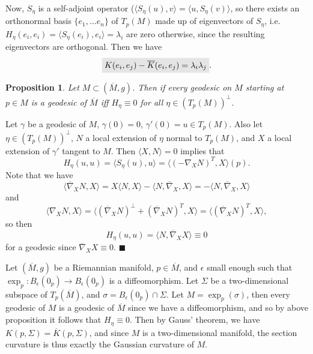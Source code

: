 \documentclass[letter-paper]{tufte-book}
\newtheorem{proposition}[theorem]{\color{pastel-blue}Proposition}
\newenvironment{proof}[1][Proof]{\begin{trivlist}
\item[\hskip \labelsep {\bfseries #1}]}{\end{trivlist}}
\newcommand{\qed}{\hfill$\blacksquare$}
\newcommand{\highlight}[1]{\mathchoice%
  {\colorbox{black!10}{$\displaystyle#1$}}%
  {\colorbox{black!10}{$\textstyle#1$}}%
  {\colorbox{black!10}{$\scriptstyle#1$}}%
  {\colorbox{black!10}{$\scriptscriptstyle#1$}}}%
\begin{document}
Now, $S_\eta$ is a self-adjoint operator ($\langle S_\eta(u), v\rangle = \langle u, S_\eta(v)\rangle$, so there exists an orthonormal basis $\{e_1,\ldots e_n\}$ of $T_p(M)$ made up of eigenvectors of $S_\eta$, i.e. $H_\eta(e_i, e_i) = \langle S_\eta(e_i), e_i\rangle = \lambda_i$ are zero otherwise, since the resulting eigenvectors are orthogonal. Then we have
\begin{equation}
  \highlight{K(e_i, e_j) - \overline{K}(e_i, e_j) = \lambda_i\lambda_j}.
\end{equation}

\begin{proposition}
  Let $M \subset (\overline{M}, g)$. Then if every geodesic on $M$ starting at $p \in M$ is a geodesic of $\overline{M}$ iff $H_\eta \equiv 0$ for all $\eta\in (T_p(M))^\perp$.
\end{proposition}

\begin{proof}
  Let $\gamma$ be a geodesic of $M$, $\gamma(0)=0$, $\gamma'(0) = u\in T_p(M)$. Also let $\eta \in (T_p(M))^\perp$, $N$ a local extension of $\eta$ normal to $T_p(M)$, and $X$ a local extension of $\gamma'$ tangent to $M$. Then $\langle X,N\rangle=0$ implies that
  \begin{equation*}
    H_\eta(u,u) = \langle S_\eta(u), u\rangle = \langle (-\nabla_X N)^T,X\rangle(p).
  \end{equation*}
  Note that we have
  \begin{equation*}
    \langle \overline{\nabla}_X N, X\rangle = X\langle N,X\rangle - \langle N, \overline{\nabla}_X, X\rangle = - \langle N, \overline{\nabla}_X, X\rangle
  \end{equation*}
  and
  \begin{equation*}
    \langle \nabla_X N, X\rangle = \langle (\overline{\nabla}_X N)^\perp + (\overline{\nabla}_X N)^T, X\rangle = \langle (\overline{\nabla}_X N)^T, X\rangle,
  \end{equation*}
  so then
  \begin{equation*}
    H_\eta(u,u) = \langle N, \overline{\nabla}_X X\rangle \equiv 0
  \end{equation*}
  for a geodesic since $\overline{\nabla}_X X \equiv 0$. \qed
\end{proof}

Let $(\overline{M},g)$ be a Riemannian manifold, $p\in\overline{M}$, and $\epsilon$ small enough such that $\exp_p: B_\epsilon(0_p) \to B_\epsilon(0_p)$ is a diffeomorphism. Let $\Sigma$ be a two-dimensional subspace of $T_p(\overline{M})$, and $\sigma = B_\epsilon(0_p) \cap \Sigma$. Let $M = \exp_p(\sigma)$, then every geodesic of $M$ is a geodesic of $\overline{M}$ since we have a diffeomorphism, and so by above proposition it follows that $H_\eta \equiv 0$. Then by Gauss' theorem, we have $K(p, \Sigma) = \overline{K}(p, \Sigma)$, and since $M$ is a two-dimensional manifold, the section curvature is thus exactly the Gaussian curvature of $M$.
\end{document}
